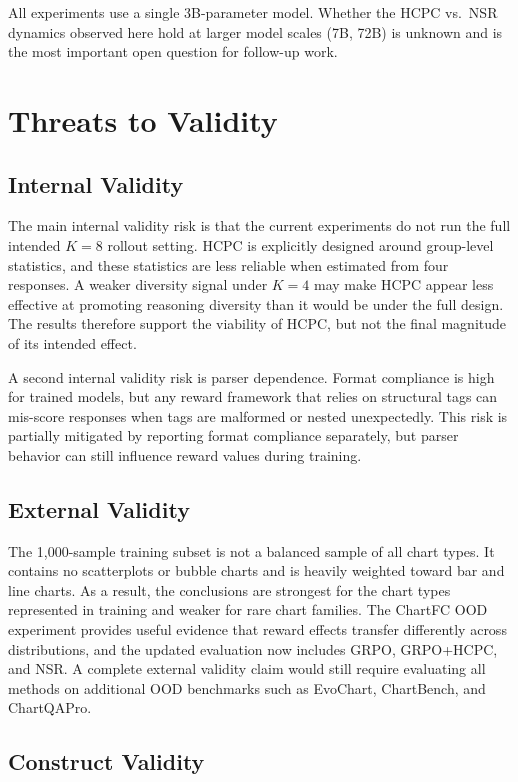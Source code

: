 \documentclass{iutbscthesis}
\begin{document}
All experiments use a single 3B-parameter model. Whether the HCPC vs.\ NSR dynamics observed here hold at larger model scales (7B, 72B) is unknown and is the most important open question for follow-up work.

\section{Threats to Validity}

\subsection{Internal Validity}

The main internal validity risk is that the current experiments do not run the full intended $K=8$ rollout setting. HCPC is explicitly designed around group-level statistics, and these statistics are less reliable when estimated from four responses. A weaker diversity signal under $K=4$ may make HCPC appear less effective at promoting reasoning diversity than it would be under the full design. The results therefore support the viability of HCPC, but not the final magnitude of its intended effect.

A second internal validity risk is parser dependence. Format compliance is high for trained models, but any reward framework that relies on structural tags can mis-score responses when tags are malformed or nested unexpectedly. This risk is partially mitigated by reporting format compliance separately, but parser behavior can still influence reward values during training.

\subsection{External Validity}

The 1,000-sample training subset is not a balanced sample of all chart types. It contains no scatterplots or bubble charts and is heavily weighted toward bar and line charts. As a result, the conclusions are strongest for the chart types represented in training and weaker for rare chart families. The ChartFC OOD experiment provides useful evidence that reward effects transfer differently across distributions, and the updated evaluation now includes GRPO, GRPO+HCPC, and NSR. A complete external validity claim would still require evaluating all methods on additional OOD benchmarks such as EvoChart, ChartBench, and ChartQAPro.

\subsection{Construct Validity}
\end{document}
